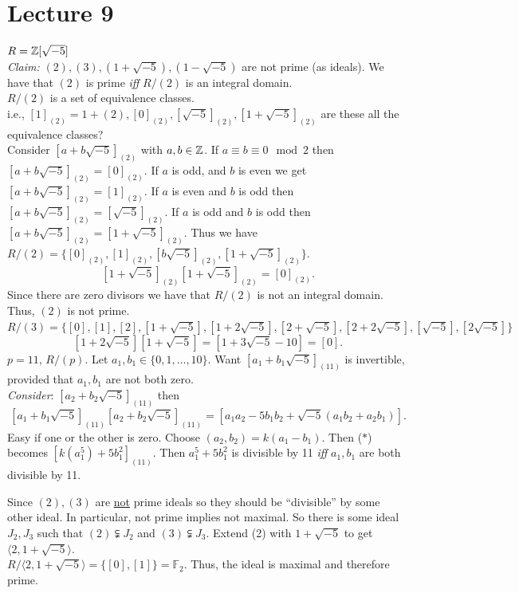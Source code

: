 \documentclass[twoside, openright, fontsize=10pt, headings=big]{scrbook}
\begin{document}
\chapter{Lecture 9}
\begin{example}{}{}
    $R=\mathbb{Z}[\sqrt{-5}]$\\
    \textit{Claim:} $(2),(3),(1+\sqrt{-5}),(1-\sqrt{-5})$ are not prime (as ideals). We have that $(2)$ is prime \textit{iff} $R/(2)$ is an integral domain.\\
    $R/(2)$ is a set of equivalence classes.\\
    i.e., $[1]_{(2)}=1+(2),[0]_{(2)},[\sqrt{-5}]_{(2)},[1+\sqrt{-5}]_{(2)}$ are these all the equivalence classes?\\
    Consider $[a+b\sqrt{-5}]_{(2)}$ with $a,b\in\mathbb{Z}$. If $a\equiv b\equiv 0\mod2$ then $[a+b\sqrt{-5}]_{(2)}=[0]_{(2)}$. If $a$ is odd, and $b$ is even we get $[a+b\sqrt{-5}]_{(2)}=[1]_{(2)}$. If $a$ is even and $b$ is odd then $[a+b\sqrt{-5}]_{(2)}=[\sqrt{-5}]_{(2)}$. If $a$ is odd and $b$ is odd then $[a+b\sqrt{-5}]_{(2)}=[1+\sqrt{-5}]_{(2)}$. Thus we have $R/(2)=\{[0]_{(2)},[1]_{(2)},[b\sqrt{-5}]_{(2)},[1+\sqrt{-5}]_{(2)}\}$. 
    \[
        [1+\sqrt{-5}]_{(2)}[1+\sqrt{-5}]_{(2)}=[0]_{(2)}.
    \]
    Since there are zero divisors we have that $R/(2)$ is not an integral domain. Thus, $(2)$ is not prime.\\
    $R/(3)=\{[0],[1],[2],[1+\sqrt{-5}],[1+2\sqrt{-5}],[2+\sqrt{-5}],[2+2\sqrt{-5}],[\sqrt{-5}],[2\sqrt{-5}]\}$
    \[
        [1+2\sqrt{-5}][1+\sqrt{-5}]=[1+3\sqrt{-5}-10]=[0].
    \]
    $p=11$, $R/(p)$. Let $a_1,b_1\in\{0,1,\dots,10\}$. Want $[a_1+b_1\sqrt{-5}]_{(11)}$ is invertible, provided that $a_1,b_1$ are not both zero.\\
    \textit{Consider}: $[a_2+b_2\sqrt{-5}]_{(11)}$ then
    \[
       [a_1+b_1\sqrt{-5}]_{(11)}[a_2+b_2\sqrt{-5}]_{(11)}=[a_1a_2-5b_1b_2+\sqrt{-5}(a_1b_2+a_2b_1)]\tag{$\ast$}.
    \]
    Easy if one or the other is zero. Choose $(a_2,b_2)=k(a_1-b_1)$. Then ($\ast$) becomes $[k(a_1^5)+5b_1^2]_{(11)}$. Then $a_1^5+5b_1^2$ is divisible by 11 \textit{iff} $a_1,b_1$ are both divisible by 11.
\end{example}
Since $(2),(3)$ are \underline{not} prime ideals so they should be ``divisible'' by some other ideal. In particular, not prime implies not maximal. So there is some ideal $J_2,J_3$ such that $(2)\subsetneqq J_2$ and $(3)\subsetneqq J_3$. Extend (2) with $1+\sqrt{-5}$ to get $\langle 2,1+\sqrt{-5} \rangle$.\\
$R/\langle2,1+\sqrt{-5} \rangle=\{[0],[1]\}=\mathbb{F}_2$. Thus, the ideal is maximal and therefore prime. 
\end{document}
